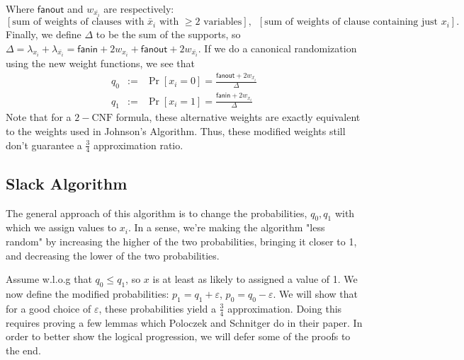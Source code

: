 \documentclass[11pt,letter]{article}
\numberwithin{theorem}{section}
\begin{document}
Where $\mathsf{fanout}$ and $w_{\bar{x_i}}$ are respectively: \[[\textrm{sum of weights of clauses with }\bar{x}_i\textrm{ with }\ge 2\textrm{ variables}] ,\,\,\, [\textrm{sum of weights of clause containing just }x_i].\]
Finally, we define $\Delta$ to be the sum of the supports, so $\Delta = \lambda_{x_i} + \lambda_{\bar{x_i}} = \mathsf{fanin} + 2w_{x_i} + \mathsf{fanout} + 2w_{\bar{x_i}}$. If we do a canonical randomization  using the new weight functions, we see that
\begin{eqnarray*}
q_0 &:=& \Pr[x_i=0] = \frac{\mathsf{fanout} + 2w_{\bar{x_i}}}{\Delta}\\
q_1 &:=& \Pr[x_i=1] = \frac{\mathsf{fanin} + 2w_{x_i}}{\Delta}
\end{eqnarray*}
Note that for a $2-\text{CNF}$ formula, these alternative weights are exactly equivalent to the weights used in Johnson's Algorithm. Thus, these modified weights still don't guarantee a $\frac{3}{4}$ approximation ratio.

\subsection*{Slack Algorithm}
The general approach of this algorithm is to change the probabilities, $q_0, q_1$ with which we assign values to $x_i$. In a sense, we're making the algorithm "less random" by increasing the higher of the two probabilities, bringing it closer to 1, and decreasing the lower of the two probabilities.

Assume w.l.o.g that $q_0 \le q_1$, so $x$ is at least as likely to assigned a value of 1. We now define the modified probabilities: $p_1 = q_1 + \varepsilon$, $p_0 = q_0 - \varepsilon$. We will show that for a good choice of $\varepsilon$, these probabilities yield a $\frac{3}{4}$ approximation. Doing this requires proving a few lemmas which Poloczek and Schnitger do in their paper. In order to better show the logical progression, we will defer some of the proofs to the end.
\end{document}
